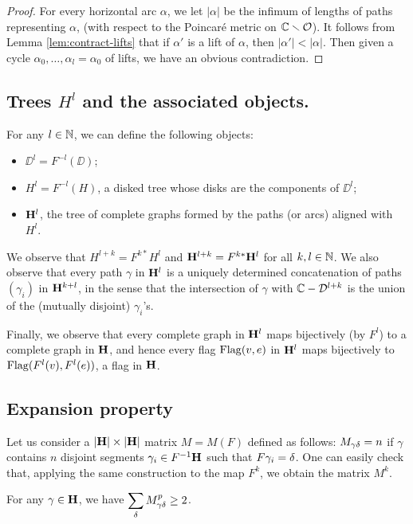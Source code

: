 \begin{proof}
For every horizontal arc $\alpha$,
we let $|\alpha|$ be the infimum of lengths of paths representing $\alpha$,
(with respect to the Poincar\'e metric on ${\Bbb C}\smallsetminus {\mathcal O}$).
It follows from Lemma \ref{lem:contract-lifts}
that if $\alpha'$ is a lift of $\alpha$,
then $|\alpha'| < |\alpha|$. 
Then given a cycle $\alpha_0, \ldots, \alpha_l = \alpha_0$ of lifts, 
we have an obvious contradiction. 
\end{proof}

\subsection{Trees $H^l$ and the associated objects.}\label{H-l}
For any  $l\in {\Bbb N}$, we can define the following objects:
\begin{itemize}
\item
  $\DD^l= F^{-l}(\DD)$;
\item
$H^l=F^{-l}(H)$, a disked tree whose disks are the components of $\DD^l$;
\item
${\mathbf{H}}^l$, the tree of complete graphs formed by the paths (or arcs) aligned with $H^l$. 
\end{itemize}
We observe that $H^{l+k} = F^{k*}H^l$ and ${\mathbf{H}}^{l+k} = F^{k*}{\mathbf{H}}^l$ for all $k, l \in {\Bbb N}$.
We also observe that every path $\gamma$ in ${\mathbf{H}}^l$ is a uniquely determined concatenation of paths $(\gamma_i)$ in ${\mathbf{H}}^{k+l}$,
in the sense that the intersection of $\gamma$ with ${\Bbb C} - {\mathcal D}^{l +k}$ is the union of the (mutually disjoint) $\gamma_i$'s. 

Finally,
we observe that every complete graph in ${\mathbf{H}}^l$ maps bijectively (by $F^l$) to a complete graph in ${\mathbf{H}}$, and hence every flag $\operatorname{Flag}(v, e)$ in ${\mathbf{H}}^l$ maps bijectively to $\operatorname{Flag}(F^l(v), F^l(e))$, a flag in ${\mathbf{H}}$. 

\subsection{Expansion property}
  Let us consider a $|{\mathbf{H}}| \times |{\mathbf{H}}| $ matrix $M=M(F)$ defined as follows:
$M_{\gamma{\delta}}=n$ if $\gamma$ contains $n$ disjoint segments $\gamma_i\in F^{-1}{\mathbf{H}}$
such that  $F\gamma_i={\delta}$. One can easily check that, 
applying the same construction to the map $F^k$,
we obtain the matrix $M^k$.

\begin{lem}\label{expansion}
   For any $\gamma\in {\mathbf{H}}$, we have $\displaystyle{\sum_{\delta}M^p_{\gamma{\delta}}\geq 2}$.
\end{lem}

